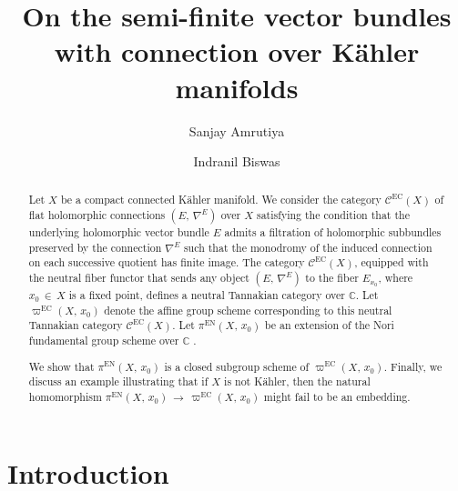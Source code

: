 \documentclass[12pt]{amsart}
\theoremstyle{definition}
\numberwithin{equation}{section}
\newcommand{\C}{\mathbb{C}}
\newcommand{\EC}{\mathcal{C}^\mathrm{EC}}
\begin{document}
\baselineskip=15.5pt

\title[Semi-finite vector bundles with connection]{On the semi-finite vector bundles with connection over K\"ahler manifolds}

\author{Sanjay Amrutiya}
\address{Department of Mathematics, IIT Gandhinagar,
 Near Village Palaj, Gandhinagar - 382355, India}

\author{Indranil Biswas}

\address{Department of Mathematics, Shiv Nadar University, NH91, Tehsil
Dadri, Greater Noida, Uttar Pradesh 201314, India}




\date{}

\begin{abstract}
Let $X$ be a compact connected K\"ahler manifold. We consider the category 
$\EC(X)$ of flat holomorphic connections $(E,\, \nabla^E)$ over $X$ satisfying the condition that the underlying
holomorphic vector bundle $E$ admits a filtration of holomorphic subbundles preserved by the connection 
$\nabla^E$ such that the monodromy of the induced connection on each successive quotient has finite image.
The category $\EC(X)$, equipped with the neutral fiber functor that 
sends any object $(E,\, \nabla^E)$ to the fiber $E_{x_0}$, where $x_0\, \in\, X$ is a
fixed point, defines a neutral Tannakian 
category over $\C$. Let $\varpi^{\mathrm{EC}}(X,\, x_0)$ denote the affine group scheme 
corresponding to this neutral Tannakian category $\EC(X)$. Let $\pi^{\mathrm{EN}}(X,\, x_0)$ be an 
extension of the Nori fundamental group scheme over $\C$ \cite{Ot}. 

We show that $\pi^{\mathrm{EN}}(X,\, x_0)$ is a closed subgroup scheme of $\varpi^{\mathrm{EC}}(X,\, x_0)$.
Finally, we discuss an example illustrating that if $X$ is not K\"ahler, then the natural homomorphism
$\pi^{\mathrm{EN}}(X,\, x_0)\, \longrightarrow\, \varpi^{\mathrm{EC}}(X,\, x_0)$ might fail to be an embedding.
\end{abstract}
\maketitle

\section{Introduction}\label{intro}
\end{document}
